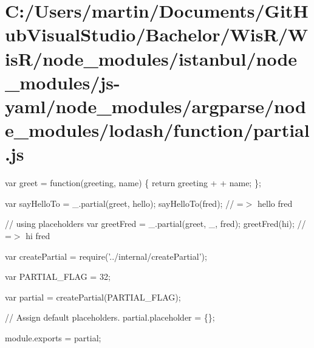 \hypertarget{_c_1_2_users_2martin_2_documents_2_git_hub_visual_studio_2_bachelor_2_wis_r_2_wis_r_2node_module7f33ccf67675cf21cca022ce1a790687}{}\section{C\+:/\+Users/martin/\+Documents/\+Git\+Hub\+Visual\+Studio/\+Bachelor/\+Wis\+R/\+Wis\+R/node\+\_\+modules/istanbul/node\+\_\+modules/js-\/yaml/node\+\_\+modules/argparse/node\+\_\+modules/lodash/function/partial.\+js}
var greet = function(greeting, name) \{ return greeting + \textquotesingle{} \textquotesingle{} + name; \};

var say\+Hello\+To = \+\_\+.\+partial(greet, \textquotesingle{}hello\textquotesingle{}); say\+Hello\+To(\textquotesingle{}fred\textquotesingle{}); // =$>$ \textquotesingle{}hello fred\textquotesingle{}

// using placeholders var greet\+Fred = \+\_\+.\+partial(greet, \+\_\+, \textquotesingle{}fred\textquotesingle{}); greet\+Fred(\textquotesingle{}hi\textquotesingle{}); // =$>$ \textquotesingle{}hi fred\textquotesingle{}


\begin{DoxyCodeInclude}
var createPartial = require(\textcolor{stringliteral}{'../internal/createPartial'});

var PARTIAL\_FLAG = 32;

var partial = createPartial(PARTIAL\_FLAG);

\textcolor{comment}{// Assign default placeholders.}
partial.placeholder = \{\};

module.exports = partial;
\end{DoxyCodeInclude}
 
